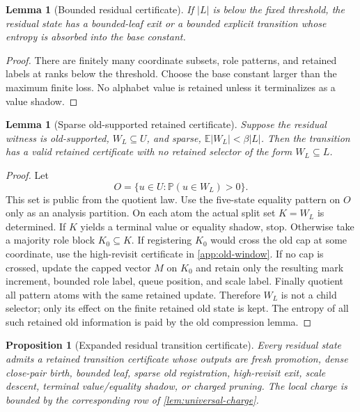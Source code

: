 \documentclass[11pt]{article}
\newcommand{\Cref}[1]{\ref{#1}}
\newtheorem{lemma}[theorem]{Lemma}
\newtheorem{proposition}[theorem]{Proposition}
\theoremstyle{remark}
\newcommand{\E}{\mathbb E}
\newcommand{\Prob}{\mathbb P}
\begin{document}
\begin{lemma}[Bounded residual certificate]\label{lem:app-bounded-residual}
If $|L|$ is below the fixed threshold, the residual state has a bounded-leaf exit or a bounded explicit transition whose entropy is absorbed into the base constant.
\end{lemma}

\begin{proof}
There are finitely many coordinate subsets, role patterns, and retained labels at ranks below the threshold.  Choose the base constant larger than the maximum finite loss.  No alphabet value is retained unless it terminalizes as a value shadow.
\end{proof}

\begin{lemma}[Sparse old-supported retained certificate]\label{lem:app-sparse-old}
Suppose the residual witness is old-supported, $W_L\subseteq U$, and sparse, $\E |W_L|<\beta |L|$.  Then the transition has a valid retained certificate with no retained selector of the form $W_L\subseteq L$.
\end{lemma}

\begin{proof}
Let
\[
        O=\{u\in U:\Prob(u\in W_L)>0\}.
\]
This set is public from the quotient law.  Use the five-state equality pattern on $O$ only as an analysis partition.  On each atom the actual split set $K=W_L$ is determined.  If $K$ yields a terminal value or equality shadow, stop.  Otherwise take a majority role block $K_0\subseteq K$.  If registering $K_0$ would cross the old cap at some coordinate, use the high-revisit certificate in \Cref{app:old-window}.  If no cap is crossed, update the capped vector $M$ on $K_0$ and retain only the resulting mark increment, bounded role label, queue position, and scale label.  Finally quotient all pattern atoms with the same retained update.  Therefore $W_L$ is not a child selector; only its effect on the finite retained old state is kept.  The entropy of all such retained old information is paid by the old compression lemma.
\end{proof}

\begin{proposition}[Expanded residual transition certificate]\label{prop:app-residual-certificate}
Every residual state admits a retained transition certificate whose outputs are fresh promotion, dense close-pair birth, bounded leaf, sparse old registration, high-revisit exit, scale descent, terminal value/equality shadow, or charged pruning.  The local charge is bounded by the corresponding row of \Cref{lem:universal-charge}.
\end{proposition}
\end{document}
